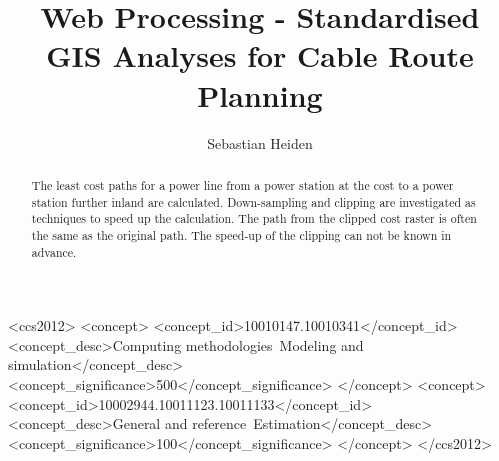 \documentclass[acmtog]{acmart}
\begin{document}
	\title{Web Processing - Standardised GIS Analyses for Cable Route Planning}
	
	\author{Sebastian Heiden}
	
	
	\renewcommand{\shortauthors}{Heiden}
	
	\begin{abstract}
		The least cost paths for a power line from a power station at the cost to a power station further inland are calculated.
		Down-sampling and clipping are investigated as techniques to speed up the calculation.
		The path from the clipped cost raster is often the same as the original path.
		The speed-up of the clipping can not be known in advance.
	\end{abstract}
	
	\begin{CCSXML}
		<ccs2012>
		<concept>
		<concept_id>10010147.10010341</concept_id>
		<concept_desc>Computing methodologies~Modeling and simulation</concept_desc>
		<concept_significance>500</concept_significance>
		</concept>
		<concept>
		<concept_id>10002944.10011123.10011133</concept_id>
		<concept_desc>General and reference~Estimation</concept_desc>
		<concept_significance>100</concept_significance>
		</concept>
		</ccs2012>
	\end{CCSXML}
	


	
	
	
	\maketitle
	
\end{document}
